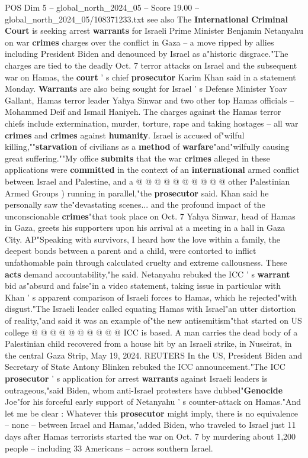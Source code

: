 \begin{textsample}{POS Dim 5 – global\_north\_2024\_05 – Score 19.00 – global\_north\_2024\_05/108371233.txt}  \label{ex:f5_pos_168}
see also The \textbf{International} \textbf{Criminal} \textbf{Court} is seeking arrest \textbf{warrants} for Israeli Prime Minister Benjamin Netanyahu on war \textbf{crimes} charges over the conflict in Gaza -- a move ripped by allies including President Biden and denounced by Israel as a"historic disgrace."The charges are tied to the deadly Oct. 7 terror attacks on Israel and the subsequent war on Hamas, the \textbf{court} ' s chief \textbf{prosecutor} Karim Khan said in a statement Monday. \textbf{Warrants} are also being sought for Israel ' s Defense Minister Yoav Gallant, Hamas terror leader Yahya Sinwar and two other top Hamas officials -- Mohammed Deif and Ismail Haniyeh.
The charges against the Hamas terror chiefs include extermination, murder, torture, rape and taking hostages -- all war \textbf{crimes} and \textbf{crimes} against \textbf{humanity}.
Israel is accused of"wilful killing,""\textbf{starvation} of civilians as a \textbf{method} of \textbf{warfare}"and"wilfully causing great suffering.""My office \textbf{submits} that the war \textbf{crimes} alleged in these applications were \textbf{committed} in the context of an \textbf{international} armed conflict between Israel and Palestine, and a @ @ @ @ @ @ @ @ @ @ other Palestinian Armed Groups ) running in parallel,"the \textbf{prosecutor} said.
Khan said he personally saw the"devastating scenes... and the profound impact of the unconscionable \textbf{crimes}"that took place on Oct. 7 Yahya Sinwar, head of Hamas in Gaza, greets his supporters upon his arrival at a meeting in a hall in Gaza City.
AP"Speaking with survivors, I heard how the love within a family, the deepest bonds between a parent and a child, were contorted to inflict unfathomable pain through calculated cruelty and extreme callousness.
These \textbf{acts} demand accountability,"he said.
Netanyahu rebuked the ICC ' s \textbf{warrant} bid as"absurd and false"in a video statement, taking issue in particular with Khan ' s apparent comparison of Israeli forces to Hamas, which he rejected"with disgust."The Israeli leader called equating Hamas with Israel"an utter distortion of reality,"and said it was an example of"the new antisemitism"that started on US college @ @ @ @ @ @ @ @ @ @ ICC is based.
A man carries the dead body of a Palestinian child recovered from a house hit by an Israeli strike, in Nuseirat, in the central Gaza Strip, May 19, 2024.
REUTERS In the US, President Biden and Secretary of State Antony Blinken rebuked the ICC announcement."The ICC \textbf{prosecutor} ' s application for arrest \textbf{warrants} against Israeli leaders is outrageous,"said Biden, whom anti-Israel protesters have dubbed"\textbf{Genocide} Joe"for his forceful early support of Netanyahu ' s counter-attack on Hamas."And let me be clear : Whatever this \textbf{prosecutor} might imply, there is no equivalence -- none -- between Israel and Hamas,"added Biden, who traveled to Israel just 11 days after Hamas terrorists started the war on Oct. 7 by murdering about 1,200 people -- including 33 Americans -- across southern Israel.

\end{textsample}
